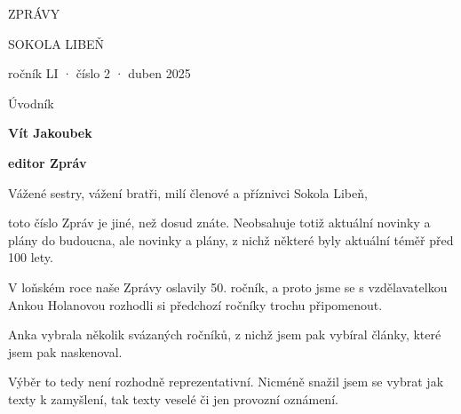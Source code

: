 \documentclass[11pt]{article}
\begin{document}
\pagecolor{sokolred}
\color{white}
\begin{center}

\vspace*{\fill}

{\titlesize \fugner ZPRÁVY}

{\titlesize \tyrs SOKOLA LIBEŇ}

\vspace*{1cm}

{\large ročník LI · číslo 2 · duben 2025}

\vspace*{\fill}
\end{center}

\clearpage
\normalcolor
\nopagecolor
{}

\pagestyle{uvodnik}


\clearpage

\pagestyle{uvodnik}

\setlength{\columnsep}{-2.5cm}
\begin{multicols}{2}
  {\fontsize{48pt}{57pt} \fugner \color{sokolred} \noindent Úvodník}

  \columnbreak

  \vspace*{-4pt}

  {\hfill\textbf{Vít Jakoubek}}
  
  {\hfill\textbf{editor Zpráv}}
 \end{multicols}

\vspace*{12pt}

\noindent
Vážené sestry, vážení bratři, milí členové a příznivci Sokola Libeň,

\noindent
toto číslo Zpráv je jiné, než dosud znáte. Neobsahuje totiž aktuální
novinky a plány do budoucna, ale novinky a plány, z nichž některé byly
aktuální téměř před 100 lety.

V loňském roce naše Zprávy oslavily 50. ročník, a proto jsme se s
vzdělavatelkou Ankou Holanovou rozhodli si předchozí ročníky trochu
připomenout.

Anka vybrala několik svázaných ročníků, z nichž jsem pak vybíral články,
které jsem pak naskenoval.

Výběr to tedy není rozhodně reprezentativní. Nicméně snažil jsem se
vybrat jak texty k zamyšlení, tak texty veselé či jen  provozní
oznámení.
\end{document}
